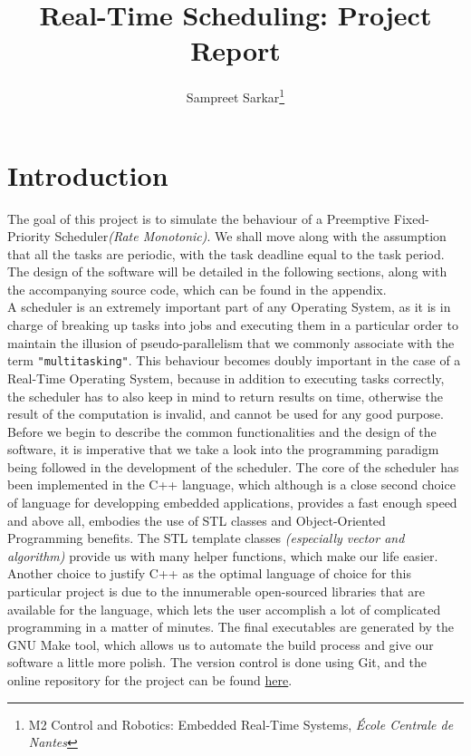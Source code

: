 



\title{Real-Time Scheduling: Project Report}
\author{Sampreet Sarkar\footnote{M2 Control and Robotics: Embedded Real-Time Systems, \textit{\'Ecole Centrale de Nantes}}}
\date{}


\nocite{*}
\maketitle

\section{Introduction}
The goal of this project is to simulate the behaviour of a Preemptive Fixed-Priority Scheduler\textit{(Rate Monotonic)}. We shall move along with the assumption that all the tasks are periodic, with the task deadline equal to the task period. The design of the software will be detailed in the following sections, along with the accompanying source code, which can be found in the appendix.\\

A scheduler is an extremely important part of any Operating System, as it is in charge of breaking up tasks into jobs and executing them in a particular order to maintain the illusion of pseudo-parallelism that we commonly associate with the term \texttt{"multitasking"}. This behaviour becomes doubly important in the case of a Real-Time Operating System, because in addition to executing tasks correctly, the scheduler has to also keep in mind to return results on time, otherwise the result of the computation is invalid, and cannot be used for any good purpose.\\

Before we begin to describe the common functionalities and the design of the software, it is imperative that we take a look into the programming paradigm being followed in the development of the scheduler. The core of the scheduler has been implemented in the C++ language, which although is a close second choice of language for developping embedded applications, provides a fast enough speed and above all, embodies the use of STL classes and Object-Oriented Programming benefits. The STL template classes \textit{(especially vector and algorithm)} provide us with many helper functions, which make our life easier. Another choice to justify C++ as the optimal language of choice for this particular project is due to the innumerable open-sourced libraries that are available for the language, which lets the user accomplish a lot of complicated programming in a matter of minutes. The final executables are generated by the GNU Make\cite{make} tool, which allows us to automate the build process and give our software a little more polish. The version control is done using Git, and the online repository for the project can be found \href{https://github.com/sampreets3/scheduler-RM}{here}.\\

